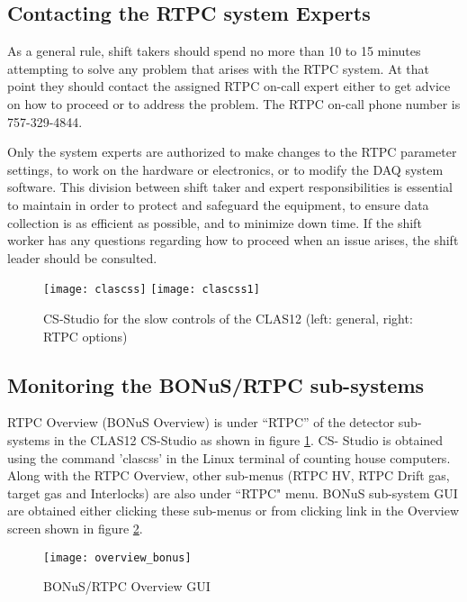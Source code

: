 \subsection{Contacting the RTPC system Experts}
\label{sub-sec:contact}

As a general rule, shift takers should spend no more than 10 to 15 minutes attempting to solve any problem that arises with the RTPC system. At that point they should contact the assigned RTPC on-call expert either to get advice on how to proceed or to address the problem. The RTPC on-call phone number is {\color{red}757-329-4844}.

Only the system experts are authorized to make changes to the RTPC parameter settings, to work on the hardware or electronics, or to modify the DAQ system software. This division between shift taker and expert responsibilities is essential to maintain in order to protect and safeguard the equipment, to ensure data collection is as efficient as possible, and to minimize down time. If the shift worker has any questions regarding how to proceed when an issue arises, the shift leader should be consulted.\\

\begin{figure}[H]
	\centering
	\texttt{[image: clascss]}
	\qquad
	\texttt{[image: clascss1]}
	\caption{CS-Studio for the slow controls of the CLAS12 (left: general, right: RTPC options)}
	\label{fig:cs-studio}
\end{figure}


\subsection{Monitoring the BONuS/RTPC sub-systems}
\label{sub-sec:rtpc_monitoring}

RTPC Overview (BONuS Overview) is under ``RTPC” of the detector sub-systems in the CLAS12 CS-Studio as shown in figure \ref{fig:cs-studio}. CS- Studio is obtained using the command ’clascss’ in the Linux terminal of counting house computers. Along with the RTPC Overview, other sub-menus (RTPC HV, RTPC Drift gas, target gas and Interlocks) are also under ``RTPC" menu. BONuS sub-system GUI are obtained either clicking these sub-menus or from clicking link in the Overview screen shown in figure \ref{fig:overview}.\\

\begin{figure}[H]
	\centering
	\texttt{[image: overview\_bonus]}
	\caption{BONuS/RTPC Overview GUI}
	\label{fig:overview}
\end{figure}

